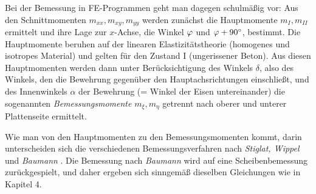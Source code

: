 Bei der Bemessung in FE-Programmen geht man dagegen schulm\"{a}{\ss}ig vor: Aus den Schnittmomenten $m_{xx}, m_{xy}, m_{yy}$ werden zun\"{a}chst die Hauptmomente $m_I, m_{II}$ ermittelt und ihre Lage zur $x$-Achse, die Winkel $\varphi$ und $\varphi + 90^\circ$, bestimmt. Die Hauptmomente beruhen auf der linearen Elastizit\"{a}tstheorie (homogenes und isotropes Material) und gelten f\"{u}r den Zustand I (ungerissener Beton). Aus diesen Hauptmomenten werden dann unter Ber\"{u}cksichtigung des Winkels $\delta$, also des Winkels, den die Bewehrung gegen\"{u}ber den Hauptachsrichtungen einschlie{\ss}t, und des Innenwinkels $\alpha$ der Bewehrung (= Winkel der Eisen untereinander)  die sogenannten {\em Bemessungsmomente\/} $m_\xi, m_\eta$ getrennt nach oberer und unterer Plattenseite ermittelt.

Wie man von den Hauptmomenten zu den Bemessungsmomenten kommt, darin unterscheiden sich die verschiedenen Bemessungsverfahren nach {\em Stiglat, Wippel\/} \cite{Stiglat} und {\em Baumann\/} \cite{Leonhardt}. Die Bemessung nach {\em Baumann\/} wird auf eine Scheibenbemessung zur\"{u}ckgespielt, und daher ergeben sich sinngem\"{a}{\ss} dieselben Gleichungen wie in Kapitel 4.

